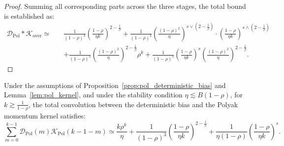\begin{proof}
Summing all corresponding parts across the three stages, the total bound is established as:
\begin{align*}
    \mathcal{D}_{\mathrm{Pol}} * \mathcal{K}_{\mathrm{over}} \simeq \quad &\frac{1}{(1-\rho)^3} \left(\frac{1-\rho}{\eta k}\right)^{2-\frac{1}{\beta}} + \frac{1}{(1-\rho)^3} \left(\frac{(1-\rho)^2}{\eta}\right)^{s \vee (2-\frac{1}{\beta})} \cdot \left(\frac{1-\rho}{\eta k}\right)^{s \wedge (2-\frac{1}{\beta})} \\
    &+ \frac{1}{(1-\rho)^3} \left(\frac{(1-\rho)^2}{\eta}\right)^{2-\frac{1}{\beta}} \rho^k + \frac{1}{(1-\rho)^3} \left(\frac{1-\rho}{\eta k}\right)^s \left(\frac{(1-\rho)^2}{\eta}\right)^{2-\frac{1}{\beta}}.
\end{align*}
\end{proof}


\begin{lemma}
\label{lem:conv_total}
Under the assumptions of Proposition~\ref{prop:pol_deterministic_bias} and Lemma~\ref{lem:pol_kernel}, and under the stability condition
$\eta\lesssim B(1-\rho)$, for $k\gtrsim \frac{1}{1-\rho}$, the total convolution between the deterministic bias and the Polyak momentum kernel satisfies:
\begin{equation*}
    \sum_{m=0}^{k-1} \mathcal{D}_{\mathrm{Pol}}(m) \mathcal{K}_{\mathrm{Pol}}(k-1-m) \simeq \frac{k\rho^k}{\eta} + \frac{1}{(1-\rho)^3} \left(\frac{1-\rho}{\eta k}\right)^{2-\frac{1}{\beta}} + \frac{1}{\eta(1-\rho)} \left(\frac{1-\rho}{\eta k}\right)^s.
\end{equation*}
\end{lemma}
